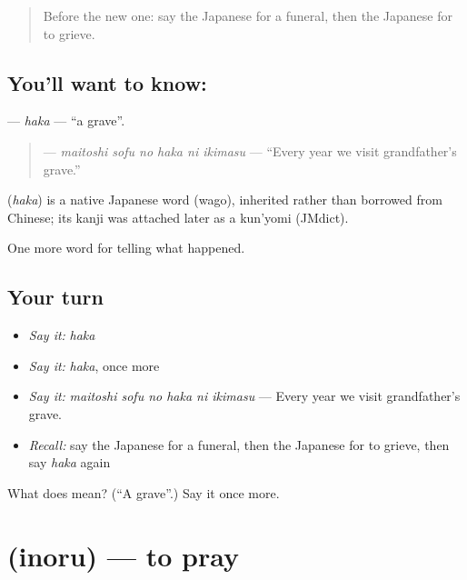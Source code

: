 \begin{quote}
Before the new one: say the Japanese for a funeral, then the Japanese for to grieve.
\end{quote}

\subsection*{You'll want to know: }
\textbf{} — \emph{haka} — \textquotedblleft{}a grave\textquotedblright{}.

\begin{quote}
\textbf{   } — \emph{maitoshi sofu no haka ni ikimasu} — \textquotedblleft{}Every year we visit grandfather's grave.\textquotedblright{}
\end{quote}

\begin{cousinweb}
\textbf{} (\emph{haka}) is a native Japanese word (wago), inherited rather than borrowed from Chinese; its kanji was attached later as a kun'yomi (JMdict).
\end{cousinweb}

\begin{grammarlens}[title={What you've built}]
One more word for telling what happened.
\end{grammarlens}

\subsection*{Your turn}
\begin{itemize}
\raggedright
  \item \emph{Say it:} \emph{haka}
  \item \emph{Say it:} \emph{haka}, once more
  \item \emph{Say it:} \emph{maitoshi sofu no haka ni ikimasu} — Every year we visit grandfather's grave.
  \item \emph{Recall:} say the Japanese for a funeral, then the Japanese for to grieve, then say \emph{haka} again
\end{itemize}

\begin{tcolorbox}[breakable,colback=teal!4,colframe=teal!35!black,title={Before you move on}]
What does  mean? (\textquotedblleft{}A grave\textquotedblright{}.) Say it once more.
\end{tcolorbox}
\section[\texorpdfstring{\ja{いのる} (inoru)}{いのる (inoru)}]{ (inoru) — to pray}

